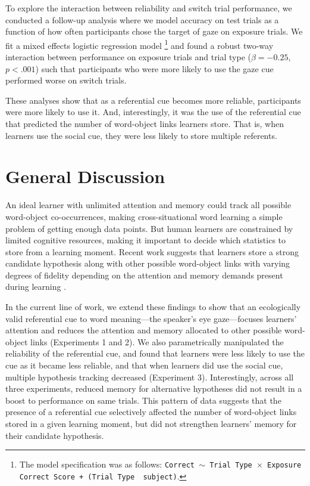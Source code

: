 \documentclass[10pt,letterpaper]{article}
\begin{document}
To explore the interaction between reliability and switch trial performance, we conducted a follow-up analysis where we model accuracy on test trials as a function of how often participants chose the target of gaze on exposure trials. We fit a mixed effects logistic regression model \footnote{The model specification was as follows: \texttt{Correct $\sim$ Trial Type~$\times$~Exposure Correct Score + (Trial Type \textbar~subject)}.} and found a robust two-way interaction between performance on exposure trials and trial type ($\beta= -0.25$, $p<.001$) such that participants who were more likely to use the gaze cue performed worse on switch trials. 

These analyses show that as a referential cue becomes more reliable, participants were more likely to use it. And, interestingly, it was the use of the referential cue that predicted the number of word-object links learners store. That is, when learners use the social cue, they were less likely to store multiple referents. 

\section{General Discussion}

An ideal learner with unlimited attention and memory could track all possible word-object co-occurrences, making cross-situational word learning a simple problem of getting enough data points. But human learners are constrained by limited cognitive resources, making it important to decide which statistics to store from a learning moment. Recent work suggests that learners store a strong candidate hypothesis along with other possible word-object links with varying degrees of fidelity depending on the attention and memory demands present during learning \cite{yurovsky2014algorithmic}. 

In the current line of work, we extend these findings to show that an ecologically valid referential cue to word meaning---the speaker's eye gaze---focuses learners' attention and reduces the attention and memory allocated to other possible word-object links (Experiments 1 and 2). We also parametrically manipulated the reliability of the referential cue, and found that learners were less likely to use the cue as it became less reliable, and that when learners did use the social cue, multiple hypothesis tracking decreased (Experiment 3). Interestingly, across all three experiments, reduced memory for alternative hypotheses did not result in a boost to performance on same trials. This pattern of data suggests that the presence of a referential cue selectively affected the number of word-object links stored in a given learning moment, but did not strengthen learners' memory for their candidate hypothesis. 
\end{document}
